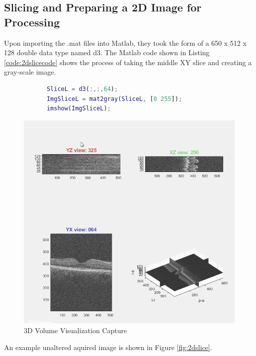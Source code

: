 \documentclass[%
reprint,
showpacs,preprintnumbers,
bibnotes,
amsmath,amssymb,
aps,
pra,
]{revtex4-1}
\begin{document}
	\subsection{\label{sec:level2} Slicing and Preparing a 2D Image for Processing}
		Upon importing the .mat files into Matlab, they took the form of a 650 x 512 x 128 double data type named d3. The Matlab code shown in Listing \ref{code:2dslicecode} shows the process of taking the middle XY slice and creating a gray-scale image.
		\begin{lstlisting}[language=Matlab, caption=Take Slice of 3D Volume, label=code:2dslicecode]
			%Take Slice of 3D Volume
			SliceL = d3(:,:,64);
			ImgSliceL = mat2gray(SliceL, [0 255]);
			imshow(ImgSliceL);
		\end{lstlisting}
		\begin{figure}
			\centering
			\includegraphics[width=0.8\linewidth]{Figures/3dvol}
			\caption{3D Volume Visualization Capture}
			\label{fig:3dvol}
		\end{figure}
		An example unaltered aquired image is shown in Figure \ref{fig:2dslice}.
\end{document}
